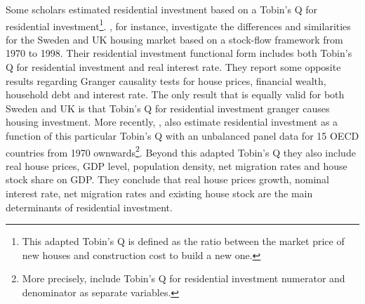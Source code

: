 \documentclass[12pt, a4paper]{article}
\begin{document}
Some scholars estimated residential investment based on a Tobin's Q for residential investment\footnote{This adapted Tobin's Q is defined as the ratio between the market price of new houses and construction cost to build a new one.}.
\textcite{barot_2002_House}, for instance, investigate the differences and similarities for the Sweden and UK housing market based on a stock-flow framework from 1970 to 1998.
Their residential investment functional form includes both Tobin's Q for residential investment and real interest rate.
They report some opposite results regarding Granger causality tests for house prices, financial wealth, household debt and interest rate.
The only result that is equally valid for both Sweden and UK is that Tobin's Q for residential investment  granger causes housing investment.
More recently, \textcite{kohlscheen_2018_Residential}, also estimate residential investment as a function of this particular Tobin's Q with an unbalanced panel data for 15 OECD countries from 1970 ownwards\footnote{More precisely, \textcite{kohlscheen_2018_Residential} include Tobin's Q for residential investment numerator and denominator as separate variables.}.
Beyond this adapted Tobin's Q they also include real house prices, GDP level, population density, net migration rates and house stock share on GDP.
They conclude that real house prices growth, nominal interest rate, net migration rates and existing house stock are the main determinants of residential investment.
\end{document}
